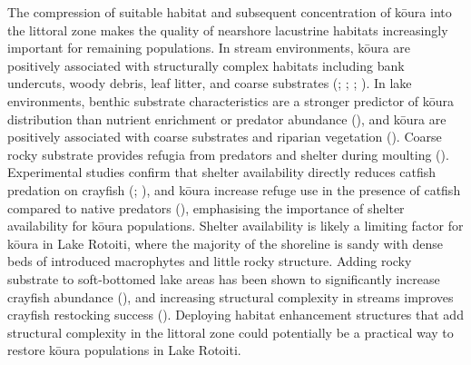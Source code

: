 \documentclass[
  letterpaper,
  DIV=11,
  numbers=noendperiod]{scrartcl}
\begin{document}
The compression of suitable habitat and subsequent concentration of
kōura into the littoral zone makes the quality of nearshore lacustrine
habitats increasingly important for remaining populations. In stream
environments, kōura are positively associated with structurally complex
habitats including bank undercuts, woody debris, leaf litter, and coarse
substrates (;
;
;
). In lake environments,
benthic substrate characteristics are a stronger predictor of kōura
distribution than nutrient enrichment or predator abundance
(), and kōura are
positively associated with coarse substrates and riparian vegetation
(). Coarse rocky substrate
provides refugia from predators and shelter during moulting
(). Experimental
studies confirm that shelter availability directly reduces catfish
predation on crayfish (;
), and kōura increase refuge
use in the presence of catfish compared to native predators
(), emphasising the
importance of shelter availability for kōura populations. Shelter
availability is likely a limiting factor for kōura in Lake Rotoiti,
where the majority of the shoreline is sandy with dense beds of
introduced macrophytes and little rocky structure. Adding rocky
substrate to soft-bottomed lake areas has been shown to significantly
increase crayfish abundance (), and increasing structural complexity in streams
improves crayfish restocking success (). Deploying habitat enhancement structures that add
structural complexity in the littoral zone could potentially be a
practical way to restore kōura populations in Lake Rotoiti.
\end{document}
